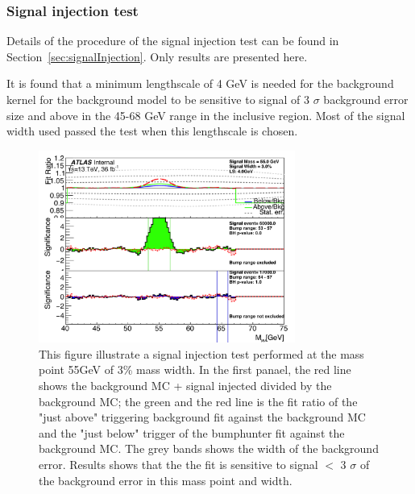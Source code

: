 \subsubsection{Signal injection test} 
\label{sec:signalinjectionresult}


Details of the procedure of the signal injection test can be found in Section~\ref{sec:signalInjection}. Only results are presented here.

It is found that a minimum lengthscale of 4 GeV is needed for the background kernel for the background model to be sensitive to signal of 3 $\sigma$ background error size and above in the 45-68 GeV range in the inclusive region. Most of the signal width used passed the test when this lengthscale is chosen. 

\begin{figure}[!htb]
    \begin{center}
        \includegraphics[width=0.75\textwidth]{figures/chapter_dimuon/signalInjection}        
        \caption{
        This figure illustrate a signal injection test performed at the mass point 55GeV of 3\% mass width. In the first panael, the red line shows the background MC + signal injected divided by the background MC; the green and the red line is the fit ratio of the "just above" triggering background fit against the background MC and the "just below" trigger of the bumphunter fit against the background MC. The grey bands shows the width of the background error. Results shows that the the fit is sensitive to signal $<$ 3 $\sigma$ of the background error in this mass point and width. }
    \label{fig:signalinjection}
    \end{center}
\end{figure}
\FloatBarrier

